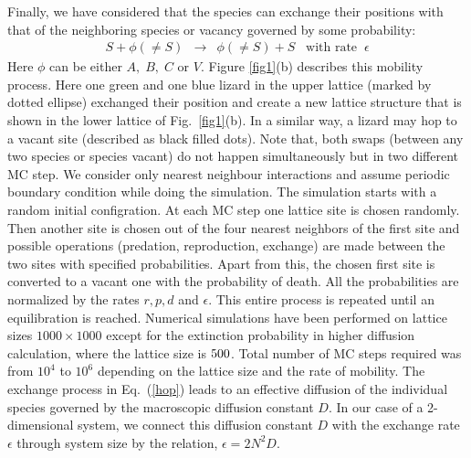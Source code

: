 \documentclass[aps, pre, twocolumn, amsmath, superscriptaddress,showkeys,showpacs]{revtex4-1}
\def\bea{\begin{eqnarray}}
\def\eea{\end{eqnarray}}
\begin{document}
  
Finally, we have considered that the species can exchange their positions with that of the neighboring species or vacancy governed by some probability:	
	\bea
	S + \phi(\neq S) & \longrightarrow & \phi(\neq S) + S \;\;\; \mbox{with rate}\;\; \epsilon
	\label{hop}
	\eea
Here $\phi$ can be either $A,\;B,\;C$ or $V$. Figure \ref{fig1}(b) describes this mobility process. {\color{blue}Here one green and one blue lizard in the upper lattice (marked by dotted ellipse)  exchanged their position and create a new lattice structure that is shown in the lower lattice of Fig.\ \ref{fig1}(b). In a similar way,  a lizard may hop to a vacant site (described as black filled dots). Note that, both swaps (between any two species or species vacant) do not happen simultaneously but in two different MC step}.      
We consider only nearest neighbour interactions and assume periodic boundary condition while doing the simulation. 
The simulation starts with a random initial configration. At each MC step one lattice site is chosen randomly. {\color{red} Then another site is chosen out of the four nearest neighbors of the first site and possible operations (predation, reproduction, exchange) are made between the two sites with specified probabilities. Apart from this, the chosen first site is converted to a vacant one with the probability of death. All the probabilities are normalized by the rates $r,p,d$ and $ \epsilon$. This entire process is repeated until an equilibration is reached.} {\color{blue}Numerical simulations have been performed on lattice sizes $1000 \times 1000$ except for the extinction probability in higher diffusion calculation, where the lattice size is $500\time500$. Total number of MC steps required was from $10^4$ to $10^6$ depending on the lattice size and the rate of mobility.} 		
The exchange process in Eq.~(\ref{hop}) leads to an effective diffusion of the individual species governed by the macroscopic diffusion constant $D$. {\color{red} In our case of a 2-dimensional system, we connect this diffusion constant $D$ with the exchange rate $\epsilon$ through system size by the relation, $\epsilon=2 N^2 D $. \cite{reichenbach2007noise} }
	
\end{document}
